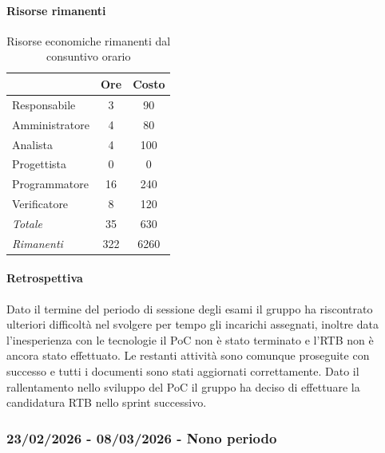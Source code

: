 \documentclass[a4paper,12pt]{article}
\begin{document}
            \paragraph{Risorse rimanenti}
                \begin{table}[H]
                \centering
                \caption{Risorse economiche rimanenti dal consuntivo orario}
                \begin{tabular}{|l|c|c|}
                \hline
                    \rowcolor{lightgray}{\textbf{Ruolo}} & {\textbf{Ore}} & {\textbf{Costo}}\\
                \hline
                    Responsabile & 3 & 90\\
                \hline
                    Amministratore & 4 & 80\\
                \hline
                    Analista & 4 & 100\\
                \hline
                    Progettista & 0 & 0\\
                \hline
                    Programmatore & 16 & 240\\
                \hline
                    Verificatore & 8 & 120\\
                \hline
                    \rowcolor{lightgray}\textit{Totale} & 35 & 630\\
                \hline
                    \rowcolor{lightgray}\textit{Rimanenti} & 322 & 6260\\
                \hline
                \end{tabular}
                \end{table}
                
            \paragraph{Retrospettiva}
            Dato il termine del periodo di sessione degli esami il gruppo ha riscontrato ulteriori difficoltà nel svolgere per tempo gli incarichi assegnati, inoltre data l'inesperienza con le tecnologie il PoC non è stato terminato e l'RTB non è ancora stato effettuato. Le restanti attività sono comunque proseguite con successo e tutti i documenti sono stati aggiornati correttamente. Dato il rallentamento nello sviluppo del PoC il gruppo ha deciso di effettuare la candidatura RTB nello sprint successivo.


        \subsubsection{23/02/2026 - 08/03/2026 - Nono periodo}
\end{document}
